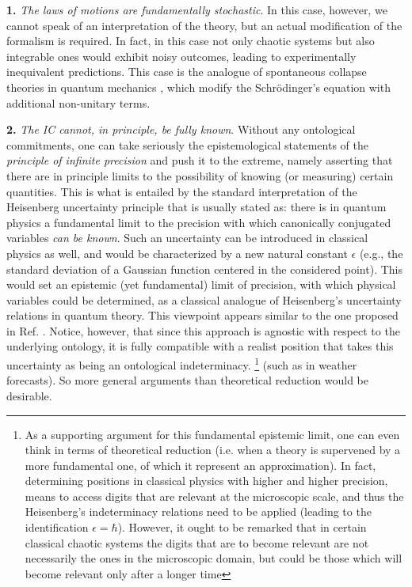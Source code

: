 \documentclass[12pt]{article}
\begin{document}
\textbf{1.} \emph{The laws of motions are fundamentally stochastic}. In this case, however, we cannot speak of an interpretation of the theory, but an actual modification of the formalism is required. In fact, in this case not only chaotic systems but also integrable ones would exhibit noisy outcomes, leading to experimentally inequivalent predictions. This case is the analogue of spontaneous collapse theories in quantum mechanics \cite{grw, gisincollapse, belljumps, cls}, which modify the Schr{\"o}dinger's equation with additional non-unitary terms.

\textbf{2.} \emph{The IC cannot, in principle, be fully known}. Without any ontological commitments, one can take seriously the epistemological statements of the \emph{principle of infinite precision} and push it to the extreme, namely asserting that there are in principle limits to the possibility of knowing (or measuring) certain quantities. This is what is entailed by the standard interpretation of the Heisenberg uncertainty principle that is usually stated as: there is in quantum physics a fundamental limit to the precision with which canonically conjugated variables \emph{can be known}.  Such an uncertainty can be introduced in classical physics as well, and would be characterized by a new natural constant $\epsilon$ (e.g., the standard deviation of a Gaussian function centered in the considered point). This would set an epistemic (yet fundamental) limit of precision, with which physical variables could be determined, as a classical analogue of  Heisenberg's uncertainty relations in quantum theory. This viewpoint appears similar to the one proposed in Ref. \cite{drossel}. Notice, however, that since this approach is agnostic with respect to the underlying ontology, it is fully compatible with a realist position that takes this uncertainty as being an ontological indeterminacy.
\footnote{As a supporting argument for this fundamental epistemic limit, one can even think in terms of theoretical reduction (i.e. when a theory is supervened by a more fundamental one, of which it represent an approximation). In fact, determining positions in classical physics with higher and higher precision, means to access digits that are relevant at the microscopic scale, and thus the Heisenberg's indeterminacy relations need to be applied (leading to the identification $\epsilon=\hbar$). However, it ought to be remarked that in certain classical chaotic systems the digits that are to become relevant are not necessarily the ones in the microscopic domain, but could be those which will become relevant only after a longer time} (such as in weather forecasts). So more general arguments than theoretical reduction would be desirable.
\end{document}
